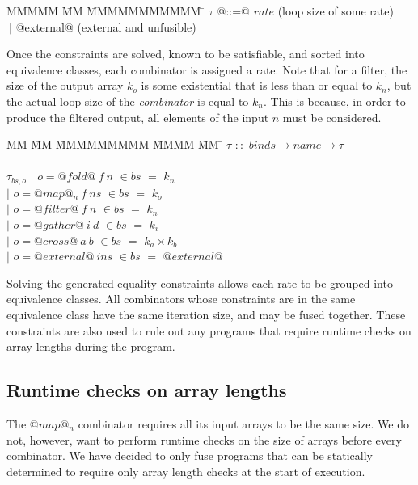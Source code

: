 \begin{tabbing}
MMMMM       \= MM \= MMMMMMMMMMM \= \kill
$\tau$       \> @::=@ \> $rate$                                  \> (loop size of some rate) \\
             \> $~|$  \> @external@                              \> (external and unfusible) \\
\end{tabbing}

Once the constraints are solved, known to be satisfiable, and sorted into equivalence classes, each combinator is assigned a rate.
Note that for a filter, the size of the output array $k_o$ is some existential that is less than or equal to $k_n$, but the actual loop size of the \emph{combinator} is equal to $k_n$.
This is because, in order to produce the filtered output, all elements of the input $n$ must be considered.


\begin{tabbing}
MM \= MM \= MMMMMMMMM \= MMMM \= MM \= \kill
$\tau$  \>$::$\> $binds \rightarrow name \rightarrow \tau$ \\
\\
$\tau_{bs,o}$    
            \> $|$ \> $o = @fold@~f~n$      \> $\in bs$ \> $=$ \> $k_n$ \\
            \> $|$ \> $o = @map@_n~f~ns$    \> $\in bs$ \> $=$ \> $k_o$ \\
            \> $|$ \> $o = @filter@~f~n$    \> $\in bs$ \> $=$ \> $k_n$ \\
            \> $|$ \> $o = @gather@~i~d$    \> $\in bs$ \> $=$ \> $k_i$ \\
            \> $|$ \> $o = @cross@~a~b$     \> $\in bs$ \> $=$ \> $k_a \times k_b$ \\
            \> $|$ \> $o = @external@~ins$  \> $\in bs$ \> $=$ \> $@external@$ \\
\end{tabbing}

Solving the generated equality constraints allows each rate to be grouped into equivalence classes.
All combinators whose constraints are in the same equivalence class have the same iteration size, and may be fused together.
These constraints are also used to rule out any programs that require runtime checks on array lengths during the program.

\subsection{Runtime checks on array lengths}
The $@map@_n$ combinator requires all its input arrays to be the same size.
We do not, however, want to perform runtime checks on the size of arrays before every combinator.
We have decided to only fuse programs that can be statically determined to require only array length checks at the start of execution. 

